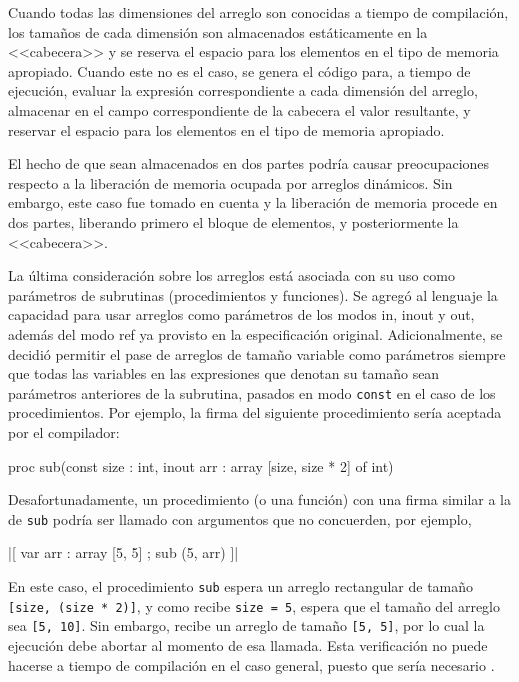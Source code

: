 Cuando todas las dimensiones del arreglo son conocidas a tiempo de compilación,
los tamaños de cada dimensión son almacenados estáticamente en la <<cabecera>> y
se reserva el espacio para los elementos en el tipo de memoria apropiado. Cuando
este no es el caso, se genera el código para, a tiempo de ejecución, evaluar la
expresión correspondiente a cada dimensión del arreglo, almacenar en el campo
correspondiente de la cabecera el valor resultante, y reservar el espacio para
los elementos en el tipo de memoria apropiado.

El hecho de que sean almacenados en dos partes podría causar preocupaciones
respecto a la liberación de memoria ocupada por arreglos dinámicos. Sin embargo,
este caso fue tomado en cuenta y la liberación de memoria procede en dos partes,
liberando primero el bloque de elementos, y posteriormente la <<cabecera>>.

La última consideración sobre los arreglos está asociada con su uso como
parámetros de subrutinas (procedimientos y funciones). Se agregó al lenguaje la
capacidad para usar arreglos como parámetros de los modos in, inout y out,
además del modo ref ya provisto en la especificación original. Adicionalmente,
se decidió permitir el pase de arreglos de tamaño variable como parámetros
siempre que todas las variables en las expresiones que denotan su tamaño sean
parámetros anteriores de la subrutina, pasados en modo \texttt{const} en el caso
de los procedimientos. Por ejemplo, la firma del siguiente procedimiento sería
aceptada por el compilador:

\begin{gracielacode}
  proc sub(const size : int, inout arr : array [size, size * 2] of int)
\end{gracielacode}

Desafortunadamente, un procedimiento (o una función) con una firma similar a la
de \texttt{sub} podría ser llamado con argumentos que no concuerden, por
ejemplo,

\begin{gracielacode}
  |[ var arr : array [5, 5]
  ;  sub (5, arr)
  ]|
\end{gracielacode}

En este caso, el procedimiento \texttt{sub} espera un arreglo rectangular de
tamaño \texttt{[size, (size * 2)]}, y como recibe \texttt{size = 5}, espera que
el tamaño del arreglo sea \texttt{[5, 10]}. Sin embargo, recibe un arreglo de
tamaño \texttt{[5, 5]}, por lo cual la ejecución debe abortar al momento de esa
llamada. Esta verificación no puede hacerse a tiempo de compilación en el caso
general, puesto que sería necesario .

